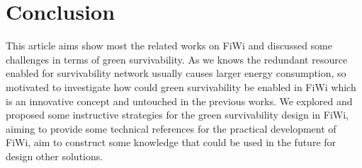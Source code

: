 \documentclass[conference,compsoc]{IEEEtran}
\begin{document}
\section{Conclusion}

This article aims show most the related works on FiWi and discussed some challenges in terms of 
green survivability. As we knows the  redundant resource enabled for survivability network usually 
causes larger energy consumption, so motivated to investigate how could  green survivability be 
enabled in FiWi which is an innovative concept and untouched in the previous works. We explored and 
proposed some instructive strategies for the green survivability  design in FiWi, aiming to provide 
some technical references for the practical development of FiWi, aim to construct some knowledge 
that could be used in the future for design other solutions.





\end{document}
